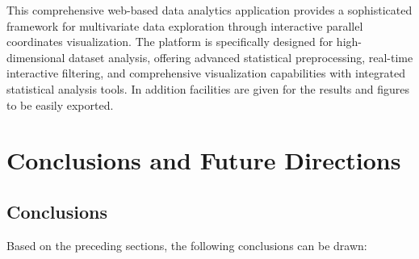 \documentclass[
	11pt, %
	fleqn, %
	a4paper, %
]{LegrandOrangeBook}
\begin{document}
This comprehensive web-based data analytics application provides a sophisticated framework for multivariate data exploration through interactive parallel coordinates visualization. The platform is specifically designed for high-dimensional dataset analysis, offering advanced statistical preprocessing, real-time interactive filtering, and comprehensive visualization capabilities with integrated statistical analysis tools. In addition facilities are given for the results and figures to be easily exported.





\part{Conclusions and Future Directions}


\chapter{Conclusions}
\label{ch:conclusions}
Based on the preceding sections, the following conclusions can be drawn:
\end{document}
